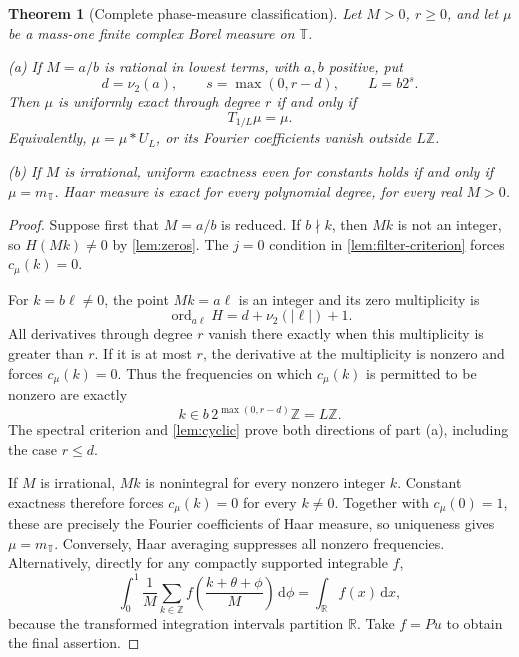 \documentclass[11pt,a4paper]{article}
\numberwithin{equation}{section}
\theoremstyle{plain}
\newtheorem{theorem}{Theorem}[section]
\theoremstyle{definition}
\theoremstyle{remark}
\newcommand{\R}{\mathbb R}
\newcommand{\Z}{\mathbb Z}
\newcommand{\T}{\mathbb T}
\newcommand{\dd}{\,\mathrm d}
\newcommand{\ord}{\operatorname{ord}}
\begin{document}
\begin{theorem}[Complete phase-measure classification]\label{thm:measure-classification}
Let $M>0$, $r\ge0$, and let $\mu$ be a mass-one finite complex Borel
measure on $\T$.

\textup{(a)} If $M=a/b$ is rational in lowest terms, with $a,b$ positive,
put
\begin{equation}\label{eq:Ldefinition}
 d=\nu_2(a),\qquad s=\max(0,r-d),\qquad L=b2^s.
\end{equation}
Then $\mu$ is uniformly exact through degree $r$ if and only if
\begin{equation}\label{eq:rational-classification}
 T_{1/L}\mu=\mu.
\end{equation}
Equivalently, $\mu=\mu*U_L$, or its Fourier coefficients vanish outside
$L\Z$.

\textup{(b)} If $M$ is irrational, uniform exactness even for constants
holds if and only if $\mu=m_{\T}$. Haar measure is exact for every
polynomial degree, for every real $M>0$.
\end{theorem}
\begin{proof}
Suppose first that $M=a/b$ is reduced. If $b\nmid k$, then $Mk$ is not
an integer, so $H(Mk)\ne0$ by \cref{lem:zeros}. The $j=0$ condition in
\cref{lem:filter-criterion} forces $c_\mu(k)=0$.

For $k=b\ell\ne0$, the point $Mk=a\ell$ is an integer and its zero
multiplicity is
\[
 \ord_{a\ell}H=d+\nu_2(|\ell|)+1.
\]
All derivatives through degree $r$ vanish there exactly when this
multiplicity is greater than $r$. If it is at most $r$, the derivative
at the multiplicity is nonzero and forces $c_\mu(k)=0$.
Thus the frequencies on which $c_\mu(k)$ is permitted to be nonzero are
exactly
\[
 k\in b\,2^{\max(0,r-d)}\Z=L\Z.
\]
The spectral criterion and \cref{lem:cyclic} prove both directions of
part (a), including the case $r\le d$.

If $M$ is irrational, $Mk$ is nonintegral for every nonzero integer $k$.
Constant exactness therefore forces $c_\mu(k)=0$ for every $k\ne0$.
Together with $c_\mu(0)=1$, these are precisely the Fourier coefficients
of Haar measure, so uniqueness gives $\mu=m_{\T}$.
Conversely, Haar averaging suppresses all nonzero frequencies.
Alternatively, directly for any compactly supported integrable $f$,
\[
 \int_0^1\frac1M\sum_{k\in\Z}
 f\!\left(\frac{k+\theta+\phi}{M}\right)\dd\phi
 =\int_\R f(x)\dd x,
\]
because the transformed integration intervals partition $\R$. Take
$f=Pu$ to obtain the final assertion.
\end{proof}
\end{document}
